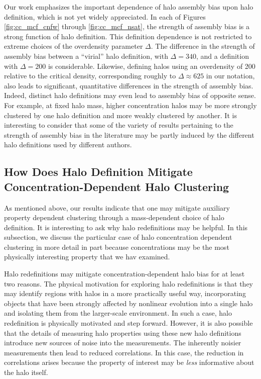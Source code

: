 \documentclass[usenatbib,fleqn]{mnras}
\begin{document}
Our work emphasizes the important dependence of halo assembly bias upon halo definition, which is not yet widely appreciated. In each of Figures \ref{fig:cc_mcf_cnfw} through \ref{fig:cc_mcf_nsat}, the strength of assembly bias is a strong function of halo definition. This definition dependence is not restricted to extreme choices of the overdensity parameter $\Delta$. The difference in the strength of assembly bias between a ``virial'' halo definition, with $\Delta=340$, and a definition with $\Delta=200$ is considerable. Likewise, defining halos using an overdensity of 200 relative to the critical density, corresponding roughly to $\Delta \approx 625$ in our notation, also leads to significant, quantitative differences in the strength of assembly bias. Indeed, distinct halo definitions may even lead to assembly bias of opposite sense. For example, at fixed halo mass, higher concentration halos may be more strongly clustered by one halo definition and more weakly clustered by another. It is interesting to consider that some of the variety of results pertaining to the strength of assembly bias in the literature may be partly induced by the different halo definitions used by different authors.


\subsection{How Does Halo Definition Mitigate Concentration-Dependent Halo Clustering}

As mentioned above, our results indicate that one may mitigate auxiliary 
property dependent clustering through a mass-dependent choice of halo 
definition. It is interesting to ask why halo redefinitions may be 
helpful. In this subsection, we discuss the particular case of halo 
concentration dependent clustering in more detail in part because concentrations may be the most physically interesting property that we 
hav examined.

Halo redefinitions may mitigate concentration-dependent halo bias for at least two reasons. The physical motivation for exploring halo redefinitions is that they may identify regions with halos in a more practically useful way, incorporating objects that have been strongly affected by nonlinear evolution into a single halo and isolating them from the larger-scale environment. In such a case, halo redefinition is physically motivated and step forward. However, it is also possible that the details of measuring halo properties using these new halo definitions introduce new sources of noise into the measurements. The inherently noisier measurements then lead to reduced correlations. In this case, the reduction in correlations arises because the property of interest may be {\em less} informative about the halo itself. 
\end{document}
